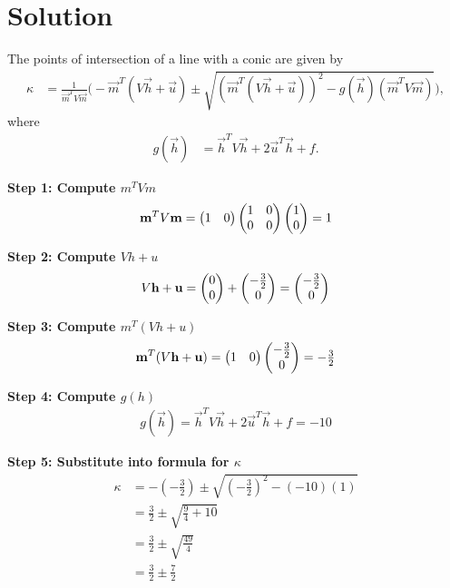 \documentclass[12pt]{article}
\begin{document}
\section*{Solution}

The points of intersection of a line with a conic are given by
\begin{align}
\kappa &= \frac{1}{\vec{m}^T V \vec{m}}
\Bigg(-\vec{m}^T(V\vec{h}+\vec{u}) 
\pm \sqrt{(\vec{m}^T(V\vec{h}+\vec{u}))^2 - g(\vec{h})(\vec{m}^T V \vec{m})}\Bigg),
\end{align}
where
\begin{align}
g(\vec{h}) &= \vec{h}^T V \vec{h} + 2\vec{u}^T \vec{h} + f.
\end{align}

\noindent\textbf{Step 1: Compute $m^T V m$}  
\begin{align}
\mathbf{m}^T V \mathbf{m} = \begin{pmatrix}1 & 0\end{pmatrix}\begin{pmatrix}1 & 0 \\ 0 & 0\end{pmatrix}\begin{pmatrix}1 \\ 0\end{pmatrix} = 1
\end{align}

\noindent\textbf{Step 2: Compute $Vh + u$}  
\begin{align}
V\mathbf{h} + \mathbf{u} = \begin{pmatrix}0 \\ 0\end{pmatrix} + \begin{pmatrix}-\tfrac{3}{2} \\ 0\end{pmatrix} = \begin{pmatrix}-\tfrac{3}{2} \\ 0\end{pmatrix}
\end{align}

\noindent\textbf{Step 3: Compute $m^T(Vh+u)$}  
\begin{align}
\mathbf{m}^T(V\mathbf{h}+\mathbf{u}) = \begin{pmatrix}1 & 0\end{pmatrix}\begin{pmatrix}-\tfrac{3}{2} \\ 0\end{pmatrix} = -\tfrac{3}{2}
\end{align}

\noindent\textbf{Step 4: Compute $g(h)$}  
\begin{align}
g(\vec{h}) = \vec{h}^T V \vec{h} + 2\vec{u}^T \vec{h} + f = -10
\end{align}

\noindent\textbf{Step 5: Substitute into formula for $\kappa$}  
\begin{align}
\kappa &= -(-\tfrac{3}{2}) \pm \sqrt{\left(-\tfrac{3}{2}\right)^2 - (-10)(1)} \\[1ex]
&= \tfrac{3}{2} \pm \sqrt{\tfrac{9}{4} + 10} \\[1ex]
&= \tfrac{3}{2} \pm \sqrt{\tfrac{49}{4}} \\[1ex]
&= \tfrac{3}{2} \pm \tfrac{7}{2}
\end{align}
\end{document}
